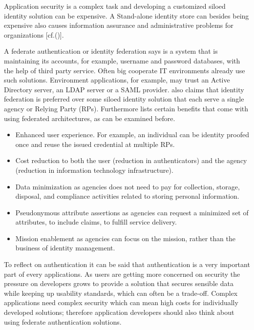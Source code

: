 Application security is a complex task and developing a customized siloed identity solution can be expensive. A Stand-alone identity store can besides being expensive also causes information assurance and administrative problems for organizations  [cf.(\cite{JerichoSystems:IS})]. 

  A federate authentication or identity federation says \cite{Boyed:2012:GSOA} is a system that is maintaining its accounts, for example, username and password databases, with the help of third party service. Often big cooperate IT environments already use such solutions. Environment applications, for example, may trust an Active Directory server, an LDAP server or a SAML provider.    \cite{NIST:2017:DIG} also claims that identity federation is preferred over some siloed identity solution that each serve a single agency or Relying Party (RPs). Furthermore \cite{NIST:2017:DIG} lists certain benefits that come with using federated architectures, as can be examined before. 

\begin{itemize}
\item Enhanced user experience. For example, an individual can be identity proofed once and reuse the issued credential at multiple RPs. 
\item Cost reduction to both the user (reduction in authenticators) and the agency (reduction in information technology infrastructure). 
\item Data minimization as agencies does not need to pay for collection, storage, disposal, and compliance activities related to storing personal information. 
\item Pseudonymous attribute assertions as agencies can request a minimized set of attributes, to include claims, to fulfill service delivery. 
\item Mission enablement as agencies can focus on the mission, rather than the business of identity management.
\end{itemize}

To reflect on authentication it can be said that authentication is a very important part of every applications. As users are getting more concerned on security the pressure on developers grows to provide a solution that secures sensible data while keeping up usability standards, which can often be a trade-off. Complex applications need complex security which can mean high costs for individually developed solutions; therefore application developers should also think about using federate authentication solutions. 


